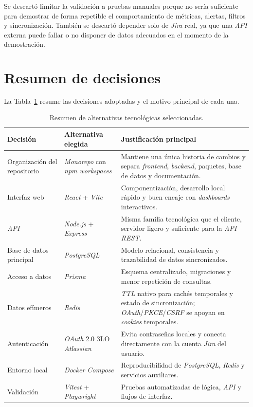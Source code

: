Se descartó limitar la validación a pruebas manuales porque no sería suficiente para demostrar de forma repetible el comportamiento de métricas, alertas, filtros y sincronización. También se descartó depender solo de \textit{Jira} real, ya que una \textit{API} externa puede fallar o no disponer de datos adecuados en el momento de la demostración.

\section{Resumen de decisiones}

La Tabla~\ref{tab:alternativasTecnicas} resume las decisiones adoptadas y el motivo principal de cada una.

\begin{table}[htbp]
\centering
\small
\begin{tabularx}{\textwidth}{p{} p{} X}
\toprule
\textbf{Decisión} & \textbf{Alternativa elegida} & \textbf{Justificación principal} \\
\midrule
Organización del repositorio & \textit{Monorepo} con \textit{npm workspaces} & Mantiene una única historia de cambios y separa \textit{frontend}, \textit{backend}, paquetes, base de datos y documentación. \\
\midrule
Interfaz web & \textit{React} + \textit{Vite} & Componentización, desarrollo local rápido y buen encaje con \textit{dashboards} interactivos. \\
\midrule
\textit{API} & \textit{Node.js} + \textit{Express} & Misma familia tecnológica que el cliente, servidor ligero y suficiente para la \textit{API REST}. \\
\midrule
Base de datos principal & \textit{PostgreSQL} & Modelo relacional, consistencia y trazabilidad de datos sincronizados. \\
\midrule
Acceso a datos & \textit{Prisma} & Esquema centralizado, migraciones y menor repetición de consultas. \\
\midrule
Datos efímeros & \textit{Redis} & \textit{TTL} nativo para cachés temporales y estado de sincronización; \textit{OAuth}/\textit{PKCE}/\textit{CSRF} se apoyan en \textit{cookies} temporales. \\
\midrule
Autenticación & \textit{OAuth} 2.0 3LO \textit{Atlassian} & Evita contraseñas locales y conecta directamente con la cuenta \textit{Jira} del usuario. \\
\midrule
Entorno local & \textit{Docker Compose} & Reproducibilidad de \textit{PostgreSQL}, \textit{Redis} y servicios auxiliares. \\
\midrule
Validación & \textit{Vitest} + \textit{Playwright} & Pruebas automatizadas de lógica, \textit{API} y flujos de interfaz. \\
\bottomrule
\end{tabularx}
\caption{Resumen de alternativas tecnológicas seleccionadas.}
\label{tab:alternativasTecnicas}
\end{table}
